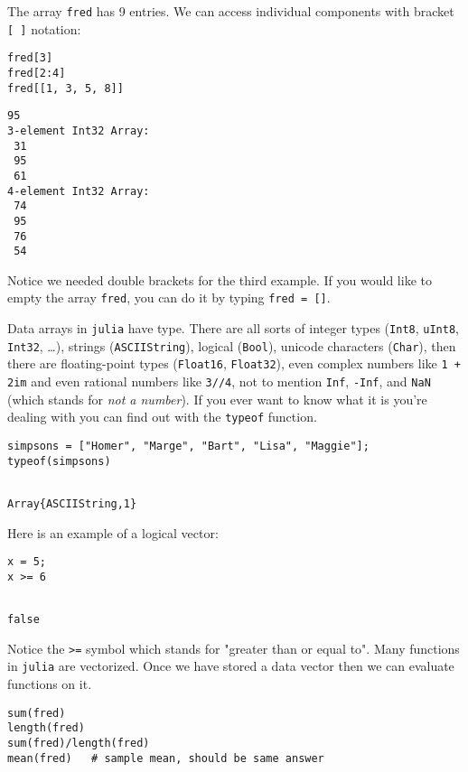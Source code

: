 \documentclass[11pt]{article}
\begin{document}
The array \texttt{fred} has 9 entries. We can access individual components
with bracket \texttt{[ ]} notation:

\begin{verbatim}
fred[3]
fred[2:4]
fred[[1, 3, 5, 8]]
\end{verbatim}

\begin{verbatim}
95
3-element Int32 Array:
 31
 95
 61
4-element Int32 Array:
 74
 95
 76
 54
\end{verbatim}

Notice we needed double brackets for the third example. If you would
like to empty the array \texttt{fred}, you can do it by typing \texttt{fred = []}.

Data arrays in \texttt{julia} have type. There are all sorts of integer types
(\texttt{Int8}, \texttt{uInt8}, \texttt{Int32}, \ldots{}), strings (\texttt{ASCIIString}), logical
(\texttt{Bool}), unicode characters (\texttt{Char}), then there are floating-point
types (\texttt{Float16}, \texttt{Float32}), even complex numbers like \texttt{1 + 2im} and
even rational numbers like \texttt{3//4}, not to mention \texttt{Inf}, \texttt{-Inf}, and
\texttt{NaN} (which stands for \emph{not a number}). If you ever want to know what
it is you're dealing with you can find out with the \texttt{typeof} function.

\begin{verbatim}
simpsons = ["Homer", "Marge", "Bart", "Lisa", "Maggie"];
typeof(simpsons)
\end{verbatim}

\begin{verbatim}

Array{ASCIIString,1}
\end{verbatim}

Here is an example of a logical vector:

\begin{verbatim}
x = 5;
x >= 6
\end{verbatim}

\begin{verbatim}

false
\end{verbatim}

Notice the \verb~>=~ symbol which stands for "greater than or equal to".
Many functions in \texttt{julia} are vectorized. Once we have stored a data
vector then we can evaluate functions on it.

\begin{verbatim}
sum(fred)
length(fred)
sum(fred)/length(fred)
mean(fred)   # sample mean, should be same answer
\end{verbatim}
\end{document}
